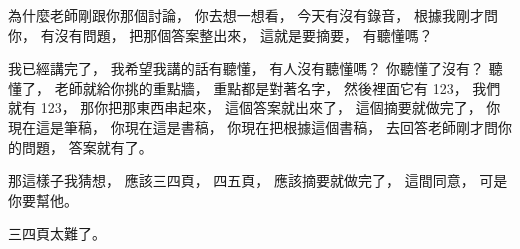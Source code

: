 \hypertarget{w06:cue:3336}{}為什麼老師剛跟你那個討論，
\hypertarget{w06:cue:3337}{}你去想一想看，
\hypertarget{w06:cue:3338}{}今天有沒有錄音，
\hypertarget{w06:cue:3339}{}根據我剛才問你，
\hypertarget{w06:cue:3340}{}有沒有問題，
\hypertarget{w06:cue:3341}{}把那個答案整出來，
\hypertarget{w06:cue:3342}{}這就是要摘要，
\hypertarget{w06:cue:3343}{}有聽懂嗎？

\hypertarget{w06:cue:3344}{}我已經講完了，
\hypertarget{w06:cue:3345}{}我希望我講的話有聽懂，
\hypertarget{w06:cue:3346}{}有人沒有聽懂嗎？
\hypertarget{w06:cue:3347}{}你聽懂了沒有？
\hypertarget{w06:cue:3348}{}聽懂了，
\hypertarget{w06:cue:3349}{}老師就給你挑的重點牆，
\hypertarget{w06:cue:3350}{}重點都是對著名字，
\hypertarget{w06:cue:3351}{}然後裡面它有 123，
\hypertarget{w06:cue:3352}{}我們就有 123，
\hypertarget{w06:cue:3353}{}那你把那東西串起來，
\hypertarget{w06:cue:3354}{}這個答案就出來了，
\hypertarget{w06:cue:3355}{}這個摘要就做完了，
\hypertarget{w06:cue:3356}{}你現在這是筆稿，
\hypertarget{w06:cue:3357}{}你現在這是書稿，
\hypertarget{w06:cue:3358}{}你現在把根據這個書稿，
\hypertarget{w06:cue:3359}{}去回答老師剛才問你的問題，
\hypertarget{w06:cue:3360}{}答案就有了。

\hypertarget{w06:cue:3361}{}那這樣子我猜想，
\hypertarget{w06:cue:3362}{}應該三四頁，
\hypertarget{w06:cue:3363}{}四五頁，
\hypertarget{w06:cue:3364}{}應該摘要就做完了，
\hypertarget{w06:cue:3365}{}這間同意，
\hypertarget{w06:cue:3366}{}可是你要幫他。

\hypertarget{w06:cue:3367}{}三四頁太難了。

